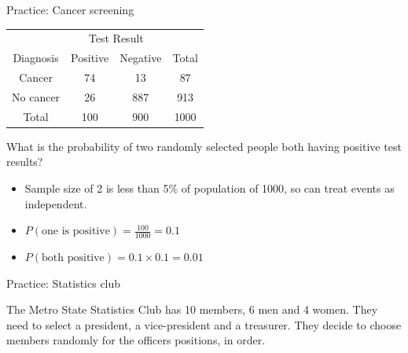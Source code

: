 \documentclass[xcolor=table, aspectratio=169, bigger]{beamer}
\begin{document}
\begin{frame}{Practice: Cancer screening}
\begin{block}{}
{\centering
\begin{tabular}{c | c  c | c}
\multicolumn{1}{c}{} & \multicolumn{2}{c}{Test Result}\\
Diagnosis & Positive & Negative & Total \\
\hline
Cancer & 74 & 13 & 87\\
No cancer & 26 & 887 & 913\\
\hline
Total & 100 & 900 & 1000
\end{tabular}\par
}
\end{block}

\begin{exampleblock}{}
What is the probability of two randomly selected people both having positive test results?

\begin{itemize}
\pause
\item Sample size of 2 is less than 5\% of population of 1000, so can treat events as independent.
\pause
\item $P(\text{one is positive}) = \frac {100}{1000} = 0.1$
\pause
\item $P(\text{both positive}) = 0.1 \times 0.1 = 0.01$
\end{itemize}
\end{exampleblock}

\end{frame}

\begin{frame}{Practice: Statistics club}
\begin{block}{}
The Metro State Statistics Club has 10 members, 6 men and 4 women. They need to select a president, a vice-president and a treasurer. They decide to choose members randomly for the officers positions, in order.
\end{block}
\end{frame}
\end{document}
